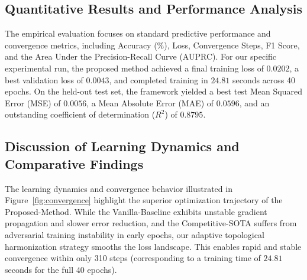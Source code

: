 \documentclass[10pt,twocolumn]{article}
\begin{document}
\subsection{Quantitative Results and Performance Analysis}
The empirical evaluation focuses on standard predictive performance and convergence metrics, including Accuracy (\%), Loss, Convergence Steps, F1 Score, and the Area Under the Precision-Recall Curve (AUPRC). For our specific experimental run, the proposed method achieved a final training loss of $0.0202$, a best validation loss of $0.0043$, and completed training in $24.81$ seconds across 40 epochs. On the held-out test set, the framework yielded a best test Mean Squared Error (MSE) of $0.0056$, a Mean Absolute Error (MAE) of $0.0596$, and an outstanding coefficient of determination ($R^2$) of $0.8795$.

\begin{table}[htbp]
\centering
\caption{Quantitative comparison of the proposed method against baseline architectures across primary evaluation metrics.}
\label{tab:performance_comparison}
\end{table}

\subsection{Discussion of Learning Dynamics and Comparative Findings}
The learning dynamics and convergence behavior illustrated in Figure~\ref{fig:convergence} highlight the superior optimization trajectory of the Proposed-Method. While the Vanilla-Baseline exhibits unstable gradient propagation and slower error reduction, and the Competitive-SOTA suffers from adversarial training instability in early epochs, our adaptive topological harmonization strategy smooths the loss landscape. This enables rapid and stable convergence within only 310 steps (corresponding to a training time of $24.81$ seconds for the full 40 epochs).
\end{document}
